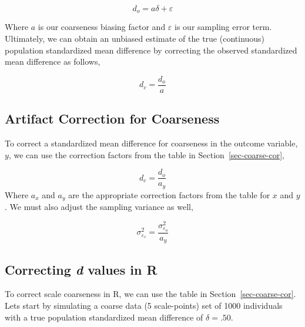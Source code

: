 \documentclass[
  letterpaper,
  DIV=11,
  numbers=noendperiod]{scrreprt}
\begin{document}
\[
d_o = a\delta+\varepsilon
\]

Where \(a\) is our coarseness biasing factor and \(\varepsilon\) is our
sampling error term. Ultimately, we can obtain an unbiased estimate of
the true (continuous) population standardized mean difference by
correcting the observed standardized mean difference as follows,

\[
d_c = \frac{d_o}{a}
\]

\hypertarget{artifact-correction-for-coarseness}{%
\subsection{Artifact Correction for
Coarseness}\label{artifact-correction-for-coarseness}}

To correct a standardized mean difference for coarseness in the outcome
variable, \(y\), we can use the correction factors from the table in
Section~\ref{sec-coarse-cor},

\[
d_c = \frac{d_o}{a_y}
\] Where \(a_x\) and \(a_y\) are the appropriate correction factors from
the table for \(x\) and \(y\). We must also adjust the sampling variance
as well,

\[
\sigma^2_{\varepsilon_c} = \frac{\sigma^2_{\varepsilon_o}}{a_y}
\]

\hypertarget{correcting-d-values-in-r}{%
\subsection{\texorpdfstring{Correcting \emph{d} values in
R}{Correcting d values in R}}\label{correcting-d-values-in-r}}

To correct scale coarseness in R, we can use the table in
Section~\ref{sec-coarse-cor}. Lets start by simulating a coarse data (5
scale-points) set of 1000 individuals with a true population
standardized mean difference of \(\delta = .50\).
\end{document}
